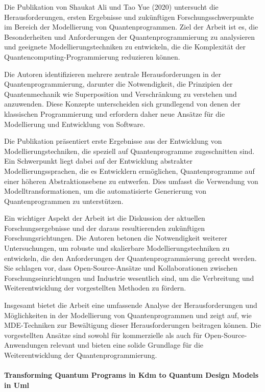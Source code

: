 Die Publikation von Shaukat Ali und Tao Yue (2020) untersucht die Herausforderungen, ersten Ergebnisse und 
zukünftigen Forschungsschwerpunkte im Bereich der Modellierung von Quantenprogrammen. Ziel der Arbeit ist es, 
die Besonderheiten und Anforderungen der Quantenprogrammierung zu analysieren und geeignete Modellierungstechniken 
zu entwickeln, die die Komplexität der Quantencomputing-Programmierung reduzieren können.

Die Autoren identifizieren mehrere zentrale Herausforderungen in der Quantenprogrammierung, darunter die 
Notwendigkeit, die Prinzipien der Quantenmechanik wie Superposition und Verschränkung zu verstehen und anzuwenden. 
Diese Konzepte unterscheiden sich grundlegend von denen der klassischen Programmierung und erfordern daher neue 
Ansätze für die Modellierung und Entwicklung von Software.

Die Publikation präsentiert erste Ergebnisse aus der Entwicklung von Modellierungstechniken, die speziell auf 
Quantenprogramme zugeschnitten sind. Ein Schwerpunkt liegt dabei auf der Entwicklung abstrakter Modellierungssprachen, 
die es Entwicklern ermöglichen, Quantenprogramme auf einer höheren Abstraktionsebene zu entwerfen. Dies umfasst die 
Verwendung von Modelltransformationen, um die automatisierte Generierung von Quantenprogrammen zu unterstützen.

Ein wichtiger Aspekt der Arbeit ist die Diskussion der aktuellen Forschungsergebnisse und der daraus resultierenden 
zukünftigen Forschungsrichtungen. Die Autoren betonen die Notwendigkeit weiterer Untersuchungen, um robuste und 
skalierbare Modellierungstechniken zu entwickeln, die den Anforderungen der Quantenprogrammierung gerecht werden. 
Sie schlagen vor, dass Open-Source-Ansätze und Kollaborationen zwischen Forschungseinrichtungen und Industrie 
wesentlich sind, um die Verbreitung und Weiterentwicklung der vorgestellten Methoden zu fördern.

Insgesamt bietet die Arbeit eine umfassende Analyse der Herausforderungen und Möglichkeiten in der Modellierung 
von Quantenprogrammen und zeigt auf, wie MDE-Techniken zur Bewältigung dieser Herausforderungen beitragen können. 
Die vorgestellten Ansätze sind sowohl für kommerzielle als auch für Open-Source-Anwendungen relevant und bieten 
eine solide Grundlage für die Weiterentwicklung der Quantenprogrammierung.

\paragraph{Transforming Quantum Programs in Kdm to Quantum Design Models in Uml}

